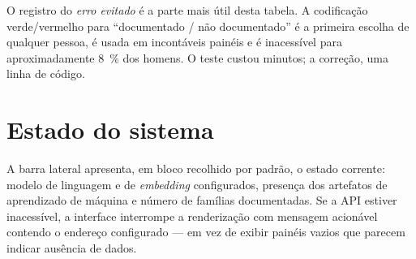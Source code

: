 \begin{nota}
O registro do \emph{erro evitado} é a parte mais útil desta tabela. A
codificação verde/vermelho para \enquote{documentado / não documentado} é a
primeira escolha de qualquer pessoa, é usada em incontáveis painéis e é
inacessível para aproximadamente \SI{8}{\percent} dos homens. O teste custou
minutos; a correção, uma linha de código.
\end{nota}

\section{Estado do sistema}

A barra lateral apresenta, em bloco recolhido por padrão, o estado corrente:
modelo de linguagem e de \textit{embedding} configurados, presença dos artefatos
de aprendizado de máquina e número de famílias documentadas. Se a API estiver
inacessível, a interface interrompe a renderização com mensagem acionável
contendo o endereço configurado --- em vez de exibir painéis vazios que parecem
indicar ausência de dados.
